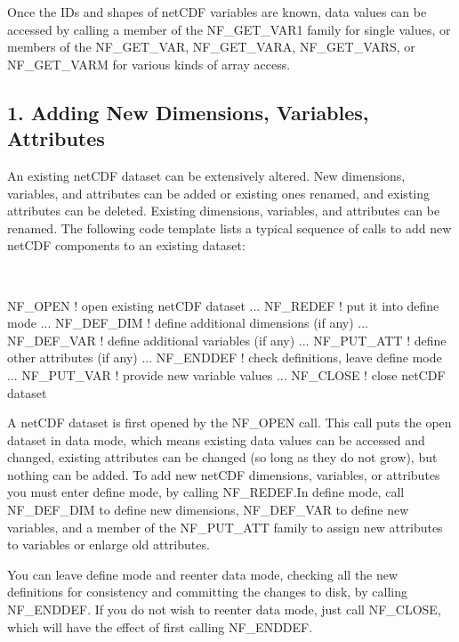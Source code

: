 Once the I\+Ds and shapes of net\+C\+DF variables are known, data values can be accessed by calling a member of the N\+F\+\_\+\+G\+E\+T\+\_\+\+V\+A\+R1 family for single values, or members of the N\+F\+\_\+\+G\+E\+T\+\_\+\+V\+AR, N\+F\+\_\+\+G\+E\+T\+\_\+\+V\+A\+RA, N\+F\+\_\+\+G\+E\+T\+\_\+\+V\+A\+RS, or N\+F\+\_\+\+G\+E\+T\+\_\+\+V\+A\+RM for various kinds of array access.\hypertarget{nc_f77_interface_guide_f77_Adding_New_Dimensions__Variables__Attributes}{}\subsection{1. Adding New Dimensions, Variables, Attributes }\label{nc_f77_interface_guide_f77_Adding_New_Dimensions__Variables__Attributes}
An existing net\+C\+DF dataset can be extensively altered. New dimensions, variables, and attributes can be added or existing ones renamed, and existing attributes can be deleted. Existing dimensions, variables, and attributes can be renamed. The following code template lists a typical sequence of calls to add new net\+C\+DF components to an existing dataset\+:

 

\begin{DoxyVerb}NF_OPEN             ! open existing netCDF dataset
  ...
NF_REDEF            ! put it into define mode
    ...
  NF_DEF_DIM        ! define additional dimensions (if any)
    ...
  NF_DEF_VAR        ! define additional variables (if any)
    ...
  NF_PUT_ATT        ! define other attributes (if any)
    ...
NF_ENDDEF           ! check definitions, leave define mode
    ...
  NF_PUT_VAR        ! provide new variable values
    ...
NF_CLOSE            ! close netCDF dataset
\end{DoxyVerb}


A net\+C\+DF dataset is first opened by the N\+F\+\_\+\+O\+P\+EN call. This call puts the open dataset in data mode, which means existing data values can be accessed and changed, existing attributes can be changed (so long as they do not grow), but nothing can be added. To add new net\+C\+DF dimensions, variables, or attributes you must enter define mode, by calling N\+F\+\_\+\+R\+E\+D\+E\+F.\+In define mode, call N\+F\+\_\+\+D\+E\+F\+\_\+\+D\+IM to define new dimensions, N\+F\+\_\+\+D\+E\+F\+\_\+\+V\+AR to define new variables, and a member of the N\+F\+\_\+\+P\+U\+T\+\_\+\+A\+TT family to assign new attributes to variables or enlarge old attributes.

You can leave define mode and reenter data mode, checking all the new definitions for consistency and committing the changes to disk, by calling N\+F\+\_\+\+E\+N\+D\+D\+EF. If you do not wish to reenter data mode, just call N\+F\+\_\+\+C\+L\+O\+SE, which will have the effect of first calling N\+F\+\_\+\+E\+N\+D\+D\+EF.

